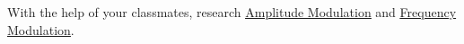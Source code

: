 { With the help of your classmates, research \href{http://en.wikipedia.org/wiki/Amplitude_modulation}{\underline{Amplitude Modulation}} and \href{http://en.wikipedia.org/wiki/Frequency_modulation}{\underline{Frequency Modulation}}.}
{}

